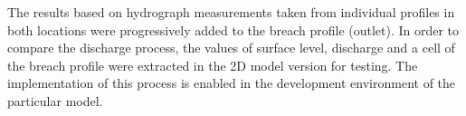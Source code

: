 The results based on hydrograph measurements taken from individual profiles in both locations were progressively added to the breach profile (outlet). In order to compare the discharge process, the values of surface level, discharge and a cell of the breach profile were extracted in the 2D model version for testing. The implementation of this process is enabled in the development environment of the particular model.